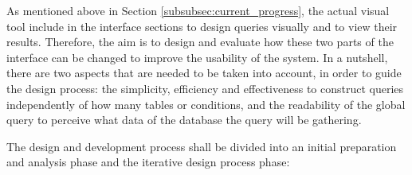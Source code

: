 As mentioned above in Section \ref{subsubsec:current_progress}, the actual visual tool include in the interface sections to design queries visually and to view their results. Therefore, the aim is to design and evaluate how these two parts of the interface can be changed to improve the usability of the system. In a nutshell, there are two aspects that are needed to be taken into account, in order to guide the design process: the simplicity, efficiency and effectiveness to construct queries independently of how many tables or conditions, and the readability of the global query to perceive what data of the database the query will be gathering.


The design and development process shall be divided into an initial preparation and analysis phase and the iterative design process phase:

